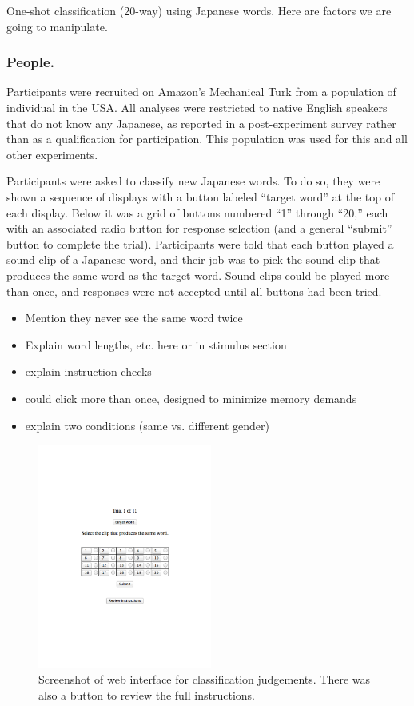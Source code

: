 \documentclass[10pt,letterpaper]{article}
\begin{document}
One-shot classification (20-way) using Japanese words. Here are factors we are going to manipulate.

\subsubsection{People.}
Participants were recruited on Amazon's Mechanical Turk from a population of individual in the USA. All analyses were restricted to native English speakers that do not know any Japanese, as reported in a post-experiment survey rather than as a qualification for participation. This population was used for this and all other experiments. 

Participants were asked to classify new Japanese words. To do so, they were shown a sequence of displays with a button labeled ``target word'' at the top of each display. Below it was a grid of buttons numbered ``1'' through ``20,'' each with an associated radio button for response selection (and a general ``submit'' button to complete the trial). Participants were told that each button played a sound clip of a Japanese word, and their job was to pick the sound clip that produces the same word as the target word. Sound clips could be played more than once, and responses were not accepted until all buttons had been tried.

\begin{itemize}
\item Mention they never see the same word twice
\item Explain word lengths, etc. here or in stimulus section
\item explain instruction checks
\item could click more than once, designed to minimize memory demands
\item explain two conditions (same vs. different gender)
\end{itemize}

\begin{figure}[h]
\centering
\includegraphics[width=2.25in]{web_exp.pdf}
\caption{Screenshot of web interface for classification judgements. There was also a button to review the full instructions.}
\label{ss}
\end{figure}
\end{document}
